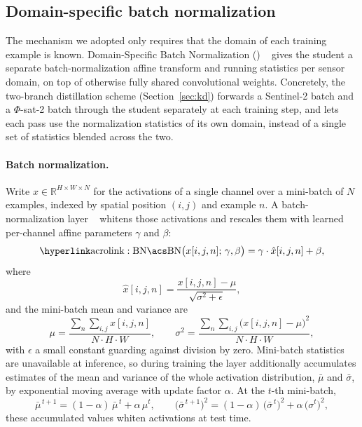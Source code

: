 \subsection{Domain-specific batch normalization}
\label{sec:dsbn-mechanism}

The mechanism we adopted only requires that the domain of each training example is known.
Domain-Specific Batch Normalization () ~\cite{chang2019dsbn} gives the student a separate batch-normalization affine transform and running statistics per sensor domain, on top of otherwise fully shared convolutional weights.
Concretely, the two-branch distillation scheme (Section~\ref{sec:kd}) forwards a Sentinel-2 batch and a $\Phi$-sat-2 batch through the student separately at each training step, and  lets each pass use the normalization statistics of its own domain, instead of a single set of statistics blended across the two.

\paragraph{Batch normalization.}
Write $x \in \mathbb{R}^{H \times W \times N}$ for the activations of a single channel over a mini-batch of $N$ examples, indexed by spatial position $(i,j)$ and example $n$.
A batch-normalization layer ~\cite{ioffe2015batchnorm} whitens those activations and rescales them with learned per-channel affine parameters $\gamma$ and $\beta$:
\begin{equation}
    \mathrm{\acref{BN}}\big(x[i,j,n];\, \gamma, \beta\big) = \gamma \cdot \hat{x}[i,j,n] + \beta,
    \label{eq:bn}
\end{equation}
where
\begin{equation}
    \hat{x}[i,j,n] = \frac{x[i,j,n] - \mu}{\sqrt{\sigma^{2} + \epsilon}},
    \label{eq:bn-whiten}
\end{equation}
and the mini-batch mean and variance are
\begin{equation}
    \mu = \frac{\sum_{n} \sum_{i,j} x[i,j,n]}{N \cdot H \cdot W},
    \qquad
    \sigma^{2} = \frac{\sum_{n} \sum_{i,j} \big(x[i,j,n] - \mu\big)^{2}}{N \cdot H \cdot W},
    \label{eq:bn-stats}
\end{equation}
with $\epsilon$ a small constant guarding against division by zero.
Mini-batch statistics are unavailable at inference, so during training the layer additionally accumulates estimates of the mean and variance of the whole activation distribution, $\bar{\mu}$ and $\bar{\sigma}$, by exponential moving average with update factor $\alpha$.
At the $t$-th mini-batch,
\begin{equation}
    \bar{\mu}^{\,t+1} = (1 - \alpha)\,\bar{\mu}^{\,t} + \alpha\,\mu^{t},
    \qquad
    \big(\bar{\sigma}^{\,t+1}\big)^{2} = (1 - \alpha)\,\big(\bar{\sigma}^{\,t}\big)^{2} + \alpha\,\big(\sigma^{t}\big)^{2},
    \label{eq:bn-ema}
\end{equation}
these accumulated values whiten activations at test time.

